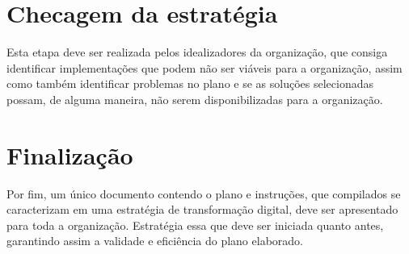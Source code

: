 \section{Checagem da estratégia}\label{sec:checagemDaEstrategia}

Esta etapa deve ser realizada pelos idealizadores da organização, que consiga identificar implementações que podem não ser viáveis para a organização, assim como também identificar problemas no plano e se as soluções selecionadas possam, de alguma maneira, não serem disponibilizadas para a organização.


\section{Finalização}

Por fim, um único documento contendo o plano e instruções, que compilados se caracterizam em uma estratégia de transformação digital, deve ser apresentado para toda a organização. Estratégia essa que deve ser iniciada quanto antes, garantindo assim a validade e eficiência do plano elaborado.